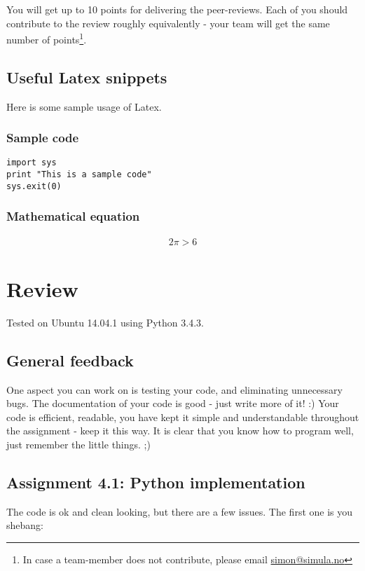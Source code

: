 \documentclass[a4paper]{article}
\begin{document}
You will get up to 10 points for delivering the peer-reviews. Each of you should contribute to the review roughly equivalently - your team will get the same number of points\footnote{In case a team-member does not contribute, please email \href{mailto:simon@simula.no}{simon@simula.no}}. 

\subsection{Useful Latex snippets}
Here is some sample usage of Latex.

\subsubsection{Sample code}
\begin{verbatim}
import sys
print "This is a sample code"
sys.exit(0)
\end{verbatim}

\subsubsection{Mathematical equation}
\begin{align}
2 \pi > 6
\end{align}



\section{Review}\label{sec:review}
Tested on Ubuntu 14.04.1 using Python 3.4.3.

\subsection*{General feedback}
One aspect you can work on is testing your code, and eliminating unnecessary bugs.
The documentation of your code is good - just write more of it! :)
Your code is efficient, readable, you have kept it simple and understandable throughout the assignment - keep it this way.
It is clear that you know how to program well, just remember the little things. ;)

\subsection*{Assignment 4.1: Python implementation}
The code is ok and clean looking, but there are a few issues.
The first one is you shebang:
\end{document}
